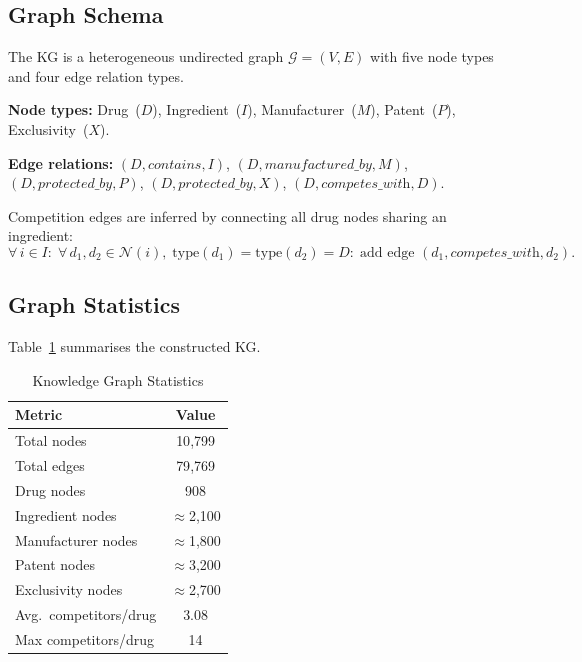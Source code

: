 \documentclass[10pt,journal,compsoc]{IEEEtran}
\newcommand{\KG}{\mathcal{G}}
\begin{document}
\subsection{Graph Schema}

The KG is a heterogeneous undirected graph $\KG=(V,E)$ with five node types and four
edge relation types.

\textbf{Node types:}
Drug~($D$), Ingredient~($I$), Manufacturer~($M$), Patent~($P$), Exclusivity~($X$).

\textbf{Edge relations:}
$(D,\textit{contains},I)$,
$(D,\textit{manufactured\_by},M)$,
$(D,\textit{protected\_by},P)$,
$(D,\textit{protected\_by},X)$,
$(D,\textit{competes\_with},D)$.

Competition edges are inferred by connecting all drug nodes sharing an ingredient:
\begin{equation}
  \forall\,i\in I:\;\forall\,d_1,d_2\in\mathcal{N}(i),\;
  \text{type}(d_1)=\text{type}(d_2)=D:\;
  \text{add edge }(d_1,\textit{competes\_with},d_2).
  \label{eq:competition_edge}
\end{equation}

\subsection{Graph Statistics}

Table~\ref{tab:kg_stats} summarises the constructed KG.

\begin{table}[!t]
\caption{Knowledge Graph Statistics}
\label{tab:kg_stats}
\centering
\begin{tabular}{lc}
\toprule
\textbf{Metric} & \textbf{Value} \\
\midrule
Total nodes            & 10{,}799 \\
Total edges            & 79{,}769 \\
Drug nodes             & 908      \\
Ingredient nodes       & $\approx$2{,}100 \\
Manufacturer nodes     & $\approx$1{,}800 \\
Patent nodes           & $\approx$3{,}200 \\
Exclusivity nodes      & $\approx$2{,}700 \\
Avg.\ competitors/drug & 3.08     \\
Max competitors/drug   & 14       \\
\bottomrule
\end{tabular}
\end{table}
\end{document}
